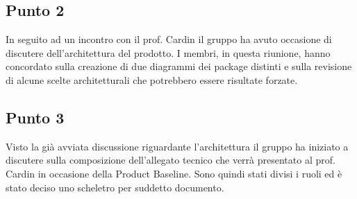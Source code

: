     \subsection{Punto 2}
        In seguito ad un incontro con il prof. Cardin il gruppo ha avuto occasione di discutere dell'architettura del prodotto\glo. I membri, in questa riunione, hanno concordato sulla creazione di due diagrammi dei package distinti e sulla revisione di alcune scelte architetturali che potrebbero essere risultate forzate.
    \subsection{Punto 3}
        Visto la già avviata discussione riguardante l'architettura il gruppo ha iniziato a discutere sulla composizione dell'allegato tecnico che verrà presentato al prof. Cardin in occasione della Product Baseline. Sono quindi stati divisi i ruoli ed è stato deciso uno scheletro per suddetto documento.